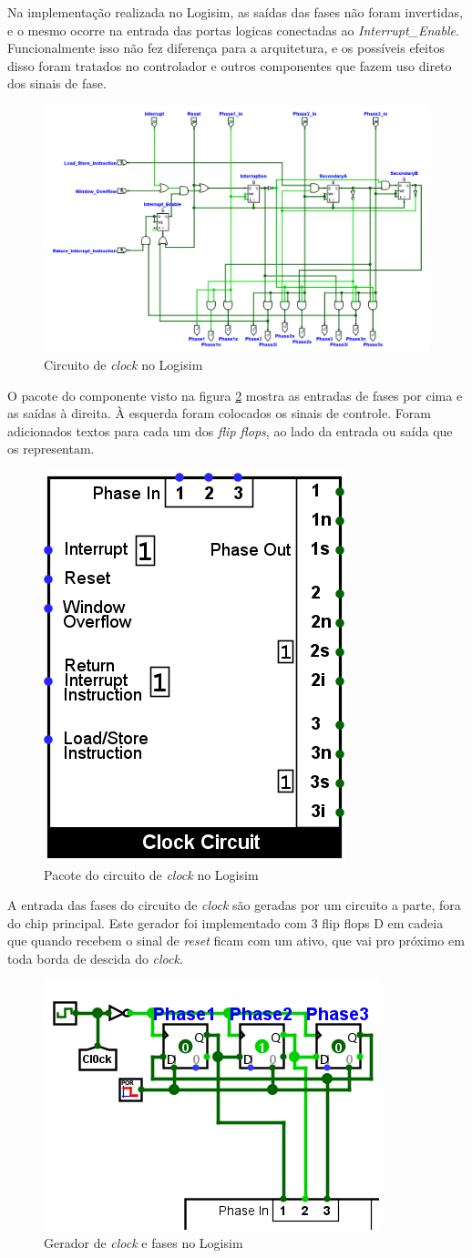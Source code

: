 \documentclass[
	article,			%
	11pt,				%
	oneside,			%
	a4paper,			%
	english,			%
	brazil,				%
	sumario=tradicional
	]{abntex2}
\begin{document}
Na implementação realizada no Logisim, as saídas das fases não foram invertidas, e o mesmo ocorre na entrada das portas logicas conectadas ao \textit{Interrupt\_Enable}. Funcionalmente isso não fez diferença para a arquitetura, e os possíveis efeitos disso foram tratados no controlador e outros componentes que fazem uso direto dos sinais de fase.
\begin{figure}[H]
    \centering
    \includegraphics[width=0.75\linewidth]{Logisim/clock.png}
    \caption{Circuito de \textit{clock} no Logisim}
    \label{fig:clock}
\end{figure}
O pacote do componente visto na figura \ref{fig:clockPack} mostra as entradas de fases por cima e as saídas à direita. À esquerda foram colocados os sinais de controle. Foram adicionados textos para cada um dos \textit{flip flops}, ao lado da entrada ou saída que os representam.

\begin{figure}[H]
        \centering
        \includegraphics[width=0.25\linewidth]{Logisim/clockPack.png}
        \caption{Pacote do circuito de \textit{clock} no Logisim}
        \label{fig:clockPack}
    \end{figure}
    A entrada das fases do circuito de \textit{clock} são geradas por um circuito a parte, fora do chip principal. Este gerador foi implementado com 3 flip flops D em cadeia que quando recebem o sinal de \textit{reset} ficam com um ativo, que vai pro próximo em toda borda de descida do \textit{clock}.
\begin{figure}[H]
    \centering
    \includegraphics[width=0.25\linewidth]{Logisim/clockGenerator.png}
    \caption{Gerador de \textit{clock} e fases no Logisim}
    \label{fig:clockGen}
\end{figure}
\end{document}
